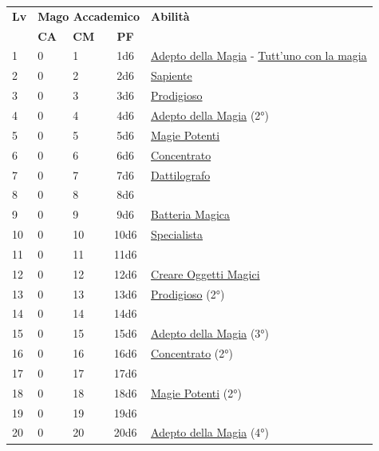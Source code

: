 {\begin{multicols}{2}

\noindent\begin{tabularx}{\linewidth}{p{0.3cm}|p{0.3cm}p{0.3cm}c|X|}
	\toprule
 \rowcolor{gray!20}	\textbf{Lv} & \multicolumn{3}{c|}{\textbf{Mago Accademico}} & \textbf{Abilità} \\
& \centering\arraybackslash \textbf{CA} & \centering\arraybackslash \textbf{CM} & \centering\arraybackslash \textbf{PF} & \\
	\toprule
	1 &0	& 1	&	1d6	&\hyperlink{Adepto della Magia}{Adepto della Magia} - \hyperlink{Tutt'uno con la magia}{Tutt'uno con la magia}\\
 \rowcolor{gray!20}2	&	0	& 2	&	2d6	&\hyperlink{Sapiente}{Sapiente}\\
	3	&	0	& 3	&	3d6	&\hyperlink{Prodigioso}{Prodigioso}\\
 \rowcolor{gray!20}4	&	0	& 4	&	4d6	&\hyperlink{Adepto della Magia}{Adepto della Magia} (2°)\\
	5	&	0	& 5	&	5d6	&\hyperlink{Magie Potenti}{Magie Potenti}\\
 \rowcolor{gray!20}6	&	0	& 6	&	6d6	&\hyperlink{Concentrato}{Concentrato}\\
	7	&	0	& 7	&	7d6	&\hyperlink{Dattilografo}{Dattilografo}\\
 \rowcolor{gray!20}8	&	0	& 8	&	8d6	&\\
	9	&	0	& 9	&	9d6	&\hyperlink{Batteria Magica}{Batteria Magica}\\
 \rowcolor{gray!20}10	&	0	& 10	&	10d6	&\hyperlink{Specialista}{Specialista}\\
	11	&	0	& 11	&	11d6	&\\
 \rowcolor{gray!20}12	&	0	& 12	&	12d6	&\hyperlink{Creare Oggetti Magici}{Creare Oggetti Magici}\\
	13	&	0	& 13	&	13d6	&\hyperlink{Prodigioso}{Prodigioso} (2°)\\
 \rowcolor{gray!20}14	&	0	& 14	&	14d6	&\\
	15	&	0	& 15	&	15d6	&\hyperlink{Adepto della Magia}{Adepto della Magia} (3°)\\
 \rowcolor{gray!20}16	&	0	& 16	&	16d6	&\hyperlink{Concentrato}{Concentrato} (2°)\\
	17	&	0	& 17	&	17d6	&\\
 \rowcolor{gray!20}18	&	0	& 18	&	18d6	&\hyperlink{Magie Potenti}{Magie Potenti} (2°)\\
	19	&	0	& 19	&	19d6	&\\
 \rowcolor{gray!20}20	&	0	& 20	&	20d6	&\hyperlink{Adepto della Magia}{Adepto della Magia} (4°)\\
\end{tabularx}


\end{multicols}}

